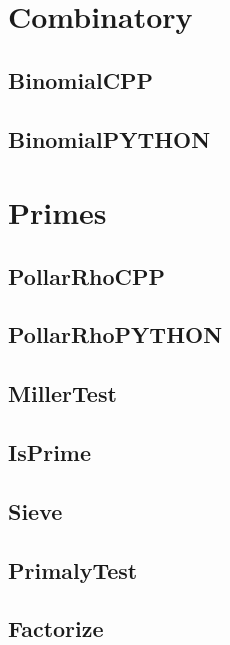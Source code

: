 \section{Combinatory}
\subsection{ BinomialCPP}
\raggedbottom
\hrulefill
\subsection{ BinomialPYTHON}
\raggedbottom
\hrulefill

\section{Primes}
\subsection{ PollarRhoCPP}
\raggedbottom
\hrulefill
\subsection{ PollarRhoPYTHON}
\raggedbottom
\hrulefill
\subsection{ MillerTest}
\raggedbottom
\hrulefill
\subsection{ IsPrime}
\raggedbottom
\hrulefill
\subsection{ Sieve}
\raggedbottom
\hrulefill
\subsection{ PrimalyTest}
\raggedbottom
\hrulefill
\subsection{ Factorize}
\raggedbottom
\hrulefill

